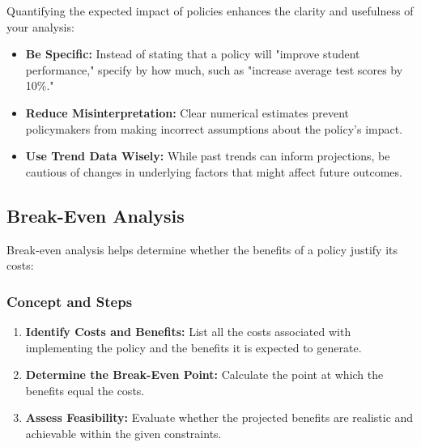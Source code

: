 \documentclass{article}
\theoremstyle{definition}
\theoremstyle{plain}
\begin{document}
Quantifying the expected impact of policies enhances the clarity and usefulness of your analysis:

\begin{itemize}
    \item \textbf{Be Specific:} Instead of stating that a policy will "improve student performance," specify by how much, such as "increase average test scores by 10\%."
    \item \textbf{Reduce Misinterpretation:} Clear numerical estimates prevent policymakers from making incorrect assumptions about the policy's impact.
    \item \textbf{Use Trend Data Wisely:} While past trends can inform projections, be cautious of changes in underlying factors that might affect future outcomes.
\end{itemize}

\subsection{Break-Even Analysis}

Break-even analysis helps determine whether the benefits of a policy justify its costs:

\subsubsection{Concept and Steps}

\begin{enumerate}[label=\arabic*.]
    \item \textbf{Identify Costs and Benefits:} List all the costs associated with implementing the policy and the benefits it is expected to generate.
    \item \textbf{Determine the Break-Even Point:} Calculate the point at which the benefits equal the costs.
    \item \textbf{Assess Feasibility:} Evaluate whether the projected benefits are realistic and achievable within the given constraints.
\end{enumerate}
\end{document}
